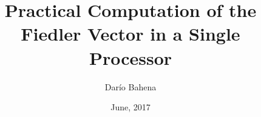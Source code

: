 \documentclass[unknownkeysallowed]{beamer}
\title{Practical Computation of the Fiedler Vector in a Single Processor}
\author{Darío Bahena}
\institute{CINVESTAV}
\date{June, 2017}
\begin{document}
	\begin{frame}[plain]
	  \titlepage
	\end{frame}
          
  
  
  
  
  
  
  
  
  
    
    
  
  
    
\end{document}
